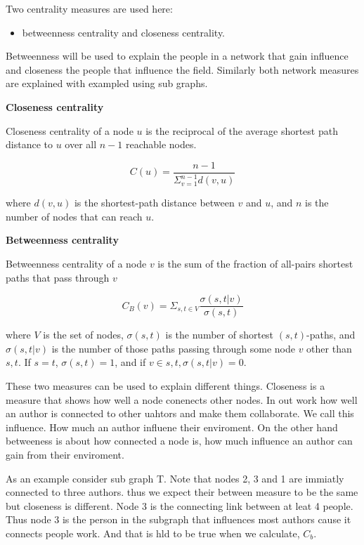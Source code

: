 \documentclass{article}
\begin{document}
Two centrality measures are used here:

\begin{itemize}
    \item betweenness centrality and closeness centrality.
\end{itemize}

Betweenness will be used to explain the people in a network that gain influence
and closeness the people that influence the field. Similarly both network measures
are explained with exampled using sub graphs.

\textbf{Closeness centrality}

Closeness centrality of a node \(u\) is the reciprocal of the average shortest
path distance to \(u\) over all \(n-1\) reachable nodes.

\[C(u)= \frac{n - 1}{\displaystyle \Sigma_{v=1}^{n-1}d(v, u)}\]

where \(d(v, u)\) is the shortest-path distance between \(v\) and \(u\), and \(n\)
is the number of nodes that can reach \(u\).

\textbf{Betweenness centrality}

Betweenness centrality of a node \(v\) is the sum of the fraction of all-pairs
shortest paths that pass through \(v\)

\[ C_B(v)=\Sigma_{s,t \in V} \frac{\sigma (s,t|v)}{\sigma(s,t)}\]

where \(V\) is the set of nodes, \(\sigma(s,t)\) is the number of shortest \((s,t)\)-paths,
and \(\sigma(s,t|v)\) is the number of those paths passing through some node
\(v\) other than \(s,t\). If \(s=t\), \(\sigma(s,t)=1\), and if \(v \in s,t, \sigma(s,t|v)=0\).

These two measures can be used to explain different things. Closeness is a measure
that shows how well a node conenects other nodes. In out work how well an author
is connected to other uahtors and make them collaborate. We call this influence.
How much an author influene their enviroment. On the other hand betweeness is 
about how connected a node is, how much influence an author can gain from their
enviroment.

As an example consider sub graph T. Note that nodes 2, 3 and 1 are immiatly connected
to three authors. thus we expect their between measure to be the same but closeness
is different. Node 3 is the connecting link between at leat 4 people. Thus node 3
is the person in the subgraph that influences most authors cause it connects people
work. And that is hld to be true when we calculate, \(C_{b}\).
\end{document}
